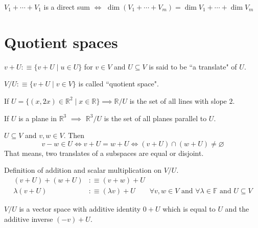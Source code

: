 \begin{thm}$V_1 + \cdots + V_1$ is a direct sum $\iff$
$\dim (V_1+\cdots+V_m) = \dim V_1 + \cdots + \dim V_m$
\end{thm}

\section{Quotient spaces}

\setcounter{thm}{94}
\begin{mydef}
    $v+U :\equiv \{v+U \mid u\in U\}$ for $v\in V$ and $U\subseteq V$ is said to be ``a translate" of $U$.
\end{mydef}

\setcounter{thm}{98}
\begin{mydef}
    $V/U :\equiv \{v+U \mid v\in V\}$ is called ``quotient space".
\end{mydef}

\begin{example}
    If $U=\{ (x,2x)\in \mathbb{R}^2 \mid x\in \mathbb{R} \} \implies \mathbb{R}/U$ is the set of all lines with slope $2$.
\end{example}

\begin{example}
    If $U$ is a plane in $\mathbb{R}^3$ $\implies$ $\mathbb{R}^3/U$ is the set of all planes parallel to $U$.
\end{example}


\setcounter{thm}{100}
\begin{thm}
    $ U \subseteq V$ and $v,w\in V$. Then
$$v-w \in U \iff v+U = w + U \iff (v+U) \cap (w+U) \neq \varnothing$$
That means, two translates of a subspaces are equal or disjoint.
\end{thm}

\begin{mydef}
    Definition of addition and scalar multiplication on $V/U$.
\begin{equation}
	\begin{aligned}
		(v+U)+(w+U) & :\equiv (v+w) + U \\
		\lambda (v+U) & :\equiv (\lambda v) + U \qquad \forall v,w \in V \text{ and } \forall \lambda \in \mathbb{F}
		\text{ and } U \subseteq V
	\end{aligned}
\end{equation}
\end{mydef}


\begin{thm}
    $V/U$ is a vector space with additive identity $0+U$ which is equal to $U$ and the additive inverse $(-v)+U$.
\end{thm}

